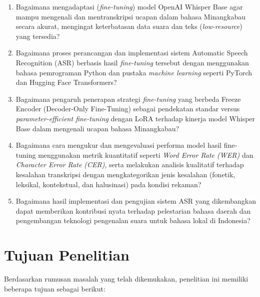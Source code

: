 \begin{enumerate}
    \item Bagaimana mengadaptasi (\textit{fine-tuning}) model OpenAI Whisper Base agar mampu mengenali dan mentranskripsi ucapan dalam bahasa Minangkabau secara akurat, mengingat keterbatasan data suara dan teks (\textit{low-resource}) yang tersedia?
    
    \item Bagaimana proses perancangan dan implementasi sistem Automatic Speech Recognition (ASR) berbasis hasil \textit{fine-tuning} tersebut dengan menggunakan bahasa pemrograman Python dan pustaka \textit{machine learning} seperti PyTorch dan Hugging Face Transformers?
    
    \item Bagaimana pengaruh penerapan strategi \textit{fine-tuning} yang berbeda Freeze Encoder (Decoder-Only Fine-Tuning) sebagai pendekatan standar versus \textit{parameter-efficient fine-tuning} dengan LoRA terhadap kinerja model Whisper Base dalam mengenali ucapan bahasa Minangkabau?
    \item Bagaimana cara mengukur dan mengevaluasi performa model hasil fine-tuning menggunakan metrik kuantitatif seperti \textit{Word Error Rate (WER)} dan \textit{Character Error Rate (CER)}, serta melakukan analisis kualitatif terhadap kesalahan transkripsi dengan mengkategorikan jenis kesalahan (fonetik, leksikal, kontekstual, dan halusinasi) pada kondisi rekaman?
    \item Bagaimana hasil implementasi dan pengujian sistem ASR yang dikembangkan dapat memberikan kontribusi nyata terhadap pelestarian bahasa daerah dan pengembangan teknologi pengenalan suara untuk bahasa lokal di Indonesia?
\end{enumerate}

\section{Tujuan Penelitian} \label{I.Tujuan}
Berdasarkan rumusan masalah yang telah dikemukakan, penelitian ini memiliki beberapa tujuan sebagai berikut:

